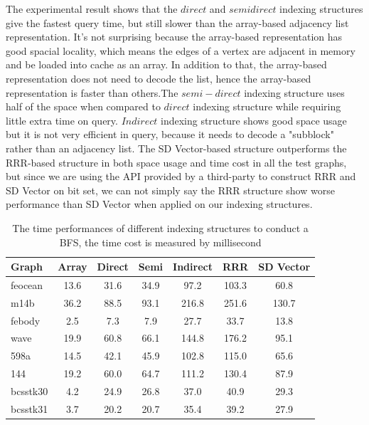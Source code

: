 \documentclass[12pt,glossary]{dalthesis}
\begin{document}
\bigskip

The experimental result shows that the $direct$ and $semi direct$ indexing structures give the fastest query time, but still slower than the array-based adjacency list representation. It's not surprising because the array-based representation has good spacial locality, which means the edges of a vertex are adjacent in memory and be loaded into cache as an array. In addition to that, the array-based representation does not need to decode the list, hence the array-based representation is faster than others.The $semi-direct$ indexing structure uses half of the space when compared to $direct$ indexing structure while requiring little extra time on query. $Indirect$ indexing structure shows good space usage but it is not very efficient in query, because it needs to decode a "subblock" rather than an adjacency list. The SD Vector-based structure outperforms the RRR-based structure in both space usage and time cost in all the test graphs, but since we are using the API provided by a third-party to construct RRR and SD Vector on bit set, we can not simply say the RRR structure show worse performance than SD Vector when applied on our indexing structures.     

\bigskip

\begin{table}[ht]
\centering
\caption{The time performances of different indexing structures to conduct a BFS, the time cost is measured by millisecond}
\label{my-label}
\begin{tabular}{|l||c||c||c||c||c||c|}
\hline
Graph    & Array & Direct & Semi & Indirect & RRR & SD Vector \\ \hline
feocean  &   13.6    &   31.6     &   34.9   &    97.2      &  103.3   & 60.8          \\
m14b     &   36.2    &    88.5    &   93.1   &   216.8   &  251.6   &   130.7        \\
febody   &   2.5    &    7.3    &   7.9   &     27.7    &   33.7  &     13.8      \\
wave     &    19.9   &    60.8    &   66.1   &    144.8     &   176.2  &   95.1        \\
598a     &    14.5   &    42.1    &   45.9   &    102.8     &  115.0   &    65.6       \\
144      &   19.2    &    60.0    &   64.7   &     111.2     &  130.4   &  87.9         \\
bcsstk30 &   4.2    &    24.9    &   26.8   &    37.0    &   40.9  &  29.3         \\
bcsstk31 &    3.7   &    20.2    &   20.7   &     35.4    &   39.2  &  27.9         \\ \hline
\end{tabular}
\end{table}
\end{document}

